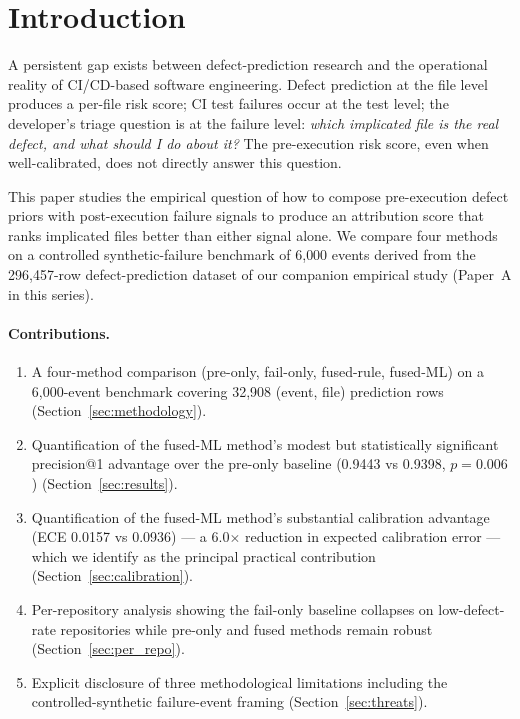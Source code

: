 \documentclass[10pt,twocolumn,letterpaper]{article}
\begin{document}
\section{Introduction}
\label{sec:intro}

A persistent gap exists between defect-prediction research and the
operational reality of CI/CD-based software engineering. Defect
prediction at the file level produces a per-file risk score; CI
test failures occur at the test level; the developer's triage
question is at the failure level: \emph{which implicated file is the
real defect, and what should I do about it?} The pre-execution risk
score, even when well-calibrated, does not directly answer this
question.

This paper studies the empirical question of how to compose
pre-execution defect priors with post-execution failure signals to
produce an attribution score that ranks implicated files better than
either signal alone. We compare four methods on a controlled
synthetic-failure benchmark of 6{,}000 events derived from the
296{,}457-row defect-prediction dataset of our companion empirical
study (Paper~A in this series).

\paragraph{Contributions.}

\begin{enumerate}
  \item A four-method comparison (pre-only, fail-only, fused-rule,
        fused-ML) on a 6{,}000-event benchmark covering 32{,}908
        (event, file) prediction rows
        (Section~\ref{sec:methodology}).
  \item Quantification of the fused-ML method's modest but
        statistically significant precision@1 advantage over the
        pre-only baseline (0.9443 vs 0.9398, $p = 0.006$)
        (Section~\ref{sec:results}).
  \item Quantification of the fused-ML method's substantial
        calibration advantage (ECE 0.0157 vs 0.0936) ---
        a 6.0$\times$ reduction in expected calibration error ---
        which we identify as the principal practical contribution
        (Section~\ref{sec:calibration}).
  \item Per-repository analysis showing the fail-only baseline
        collapses on low-defect-rate repositories while pre-only and
        fused methods remain robust (Section~\ref{sec:per_repo}).
  \item Explicit disclosure of three methodological limitations
        including the controlled-synthetic failure-event framing
        (Section~\ref{sec:threats}).
\end{enumerate}
\end{document}

